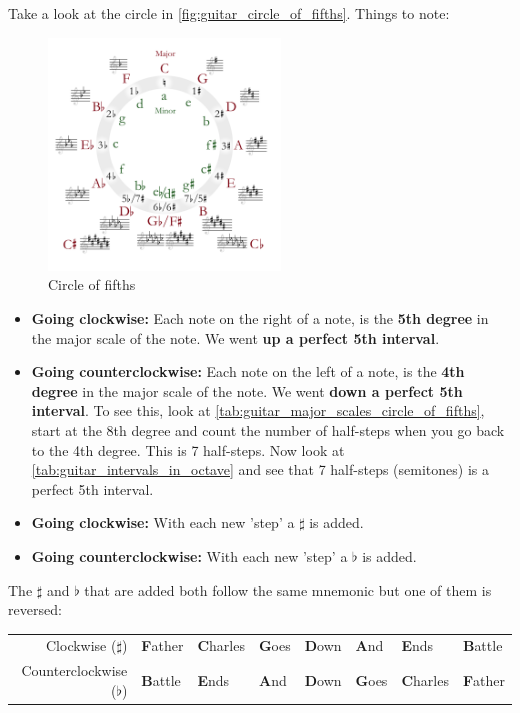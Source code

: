 Take a look at the circle in \autoref{fig:guitar_circle_of_fifths}. Things to note:

\begin{figure}[h]
	\centering
	\includegraphics[width=0.55\textwidth]{../../Images/Circle_of_fifths_deluxe_4.svg.png}
	\caption{Circle of fifths \cite{CircleOfFifthsImageWikipedia}}
	\label{fig:guitar_circle_of_fifths}
\end{figure}

\begin{itemize}
	\item \textbf{Going clockwise:} Each note on the right of a note, is the \textbf{5th degree} in the major scale of the note. We went \textbf{up a perfect 5th interval}.
	\item \textbf{Going counterclockwise:} Each note on the left of a note, is the \textbf{4th degree} in the major scale of the note. We went \textbf{down a perfect 5th interval}. To see this, look at \autoref{tab:guitar_major_scales_circle_of_fifths}, start at the 8th degree and count the number of half-steps when you go back to the 4th degree. This is 7 half-steps. Now look at \autoref{tab:guitar_intervals_in_octave} and see that 7 half-steps (semitones) is a perfect 5th interval.
\end{itemize}

\begin{itemize}
	\item \textbf{Going clockwise:} With each new 'step' a $\sharp$ is added. 
	\item \textbf{Going counterclockwise:} With each new 'step' a $\flat$ is added.
\end{itemize}

The $\sharp$ and $\flat$ that are added both follow the same mnemonic but one of them is reversed:

\begin{table}[h]
	\centering
	\begin{NiceTabular}{r | l l l l l l l}
		Clockwise ($\sharp$) & \textbf{F}ather & \textbf{C}harles & \textbf{G}oes & \textbf{D}own & \textbf{A}nd & \textbf{E}nds & \textbf{B}attle \\
		Counterclockwise ($\flat$) & \textbf{B}attle & \textbf{E}nds & \textbf{A}nd & \textbf{D}own & \textbf{G}oes & \textbf{C}harles & \textbf{F}ather \\
	\end{NiceTabular}
\end{table}


